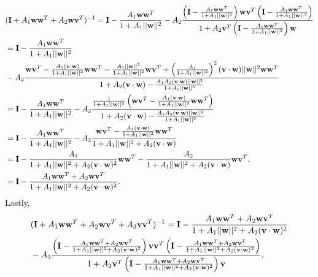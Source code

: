 \documentclass[11pt]{article}
\begin{document}
\begin{align*}
	&(\mathbf{I} + A_1 \mathbf{ww}^T + A_2 \mathbf{wv}^T)^{-1} = \mathbf{I} - \frac{A_1 \mathbf{ww}^T}{1 + A_1 ||\mathbf{w}||^2} - A_2\frac{\left(\mathbf{I} - \frac{A_1 \mathbf{ww}^T}{1 + A_1 ||\mathbf{w}||^2}\right)\mathbf{wv}^T \left(\mathbf{I} - \frac{A_1 \mathbf{ww}^T}{1 + A_1 ||\mathbf{w}||^2}\right)}{1 + A_2\mathbf{v}^T \left(\mathbf{I} - \frac{A_1 \mathbf{ww}^T}{1 + A_1 ||\mathbf{w}||^2}\right)\mathbf{w}} \\
	&= \mathbf{I} -  \frac{A_1 \mathbf{ww}^T}{1 + A_1 ||\mathbf{w}||^2} \notag \\
	&-A_2\frac{\mathbf{wv}^T - \frac{A_1(\mathbf{v}\cdot \mathbf{w})}{1+ A_1||\mathbf{w}||^2} \mathbf{ww}^T - \frac{A_1||\mathbf{w}||^2}{1+ A_1||\mathbf{w}||^2} \mathbf{wv}^T  + \left(\frac{A_1}{1+ A_1||\mathbf{w}||^2}\right)^2 (\mathbf{v}\cdot \mathbf{w}) ||\mathbf{w}||^2 \mathbf{ww}^T}{1 + A_2 (\mathbf{v}\cdot \mathbf{w}) - \frac{A_1 A_2 (\mathbf{v}\cdot\mathbf{w}) ||\mathbf{w}||^2}{1 + A_1 ||\mathbf{w}||^2}} \\
	&=  \mathbf{I} -  \frac{A_1 \mathbf{ww}^T}{1 + A_1 ||\mathbf{w}||^2}  - A_2\frac{\frac{1}{1+ A_1||\mathbf{w}||^2} \left(\mathbf{wv}^T -\frac{A_1 (\mathbf{v}\cdot \mathbf{w})}{1 + A_1 ||\mathbf{w}||^2} \mathbf{ww}^T\right)}{1 + A_2 (\mathbf{v}\cdot \mathbf{w}) - \frac{A_1 A_2 (\mathbf{v}\cdot\mathbf{w}) ||\mathbf{w}||^2}{1 + A_1 ||\mathbf{w}||^2}}\\
	&= \mathbf{I} -  \frac{A_1 \mathbf{ww}^T}{1 + A_1 ||\mathbf{w}||^2} - A_2\frac{\mathbf{wv}^T -\frac{A_1 (\mathbf{v}\cdot \mathbf{w})}{1 + A_1 ||\mathbf{w}||^2} \mathbf{ww}^T}{1 + A_1 ||\mathbf{w}||^2 + A_2 (\mathbf{v} \cdot \mathbf{w})} \\
	&= \mathbf{I} - \frac{A_1}{1 + A_1 ||\mathbf{w}||^2 + A_2 (\mathbf{v}\cdot \mathbf{w})^2} \mathbf{ww}^T - \frac{A_2}{1 + A_1 ||\mathbf{w}||^2 + A_2(\mathbf{v}\cdot \mathbf{w})}\mathbf{wv}^T.\\
	&= \mathbf{I} - \frac{A_1 \mathbf{ww}^T + A_2 \mathbf{wv}^T}{1 + A_1 ||\mathbf{w}||^2 + A_2 (\mathbf{v}\cdot\mathbf{w})^2}.
\end{align*}
Lastly, 
\begin{align}
	&(\mathbf{I} + A_1 \mathbf{ww}^T + A_2 \mathbf{wv}^T + A_3 \mathbf{vv}^T)^{-1} = \mathbf{I} - \frac{A_1 \mathbf{ww}^T + A_2 \mathbf{wv}^T}{1 + A_1 ||\mathbf{w}||^2 + A_2 (\mathbf{v}\cdot\mathbf{w})^2} \notag \\
	&-A_3 \frac{\left(\mathbf{I} - \frac{A_1 \mathbf{ww}^T + A_2 \mathbf{wv}^T}{1 + A_1 ||\mathbf{w}||^2 + A_2 (\mathbf{v}\cdot\mathbf{w})^2}\right)\mathbf{vv}^T \left(\mathbf{I} - \frac{A_1 \mathbf{ww}^T + A_2 \mathbf{wv}^T}{1 + A_1 ||\mathbf{w}||^2 + A_2 (\mathbf{v}\cdot\mathbf{w})^2}\right)}{1 + A_3 \mathbf{v}^T \left(\mathbf{I} - \frac{A_1 \mathbf{ww}^T + A_2 \mathbf{wv}^T}{1 + A_1 ||\mathbf{w}||^2 + A_2 (\mathbf{v}\cdot\mathbf{w})^2}\right)\mathbf{v}}.
\end{align}
\end{document}
